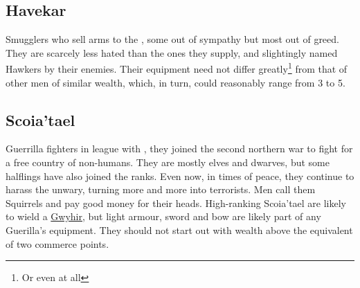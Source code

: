 \documentclass[parskip=full,11pt]{scrreport}
\begin{document}
\subsection{Havekar}
Smugglers who sell arms to the , some out of sympathy but most out of greed. They are scarcely less hated than the ones they supply,
and slightingly named Hawkers by their enemies. Their equipment need not differ greatly\footnote{Or even at all} from that of other men of similar
wealth, which, in turn, could reasonably range from 3 to 5.

\subsection{Scoia'tael}\label{profession:scoiatael}
Guerrilla fighters in league with , they joined the second northern war to fight for a free country of non-humans.
They are mostly elves and dwarves, but some halflings have also joined the ranks. Even now, in times of peace, they continue to harass the
unwary, turning more and more into terrorists. Men call them Squirrels and pay good money for their heads. High-ranking Scoia'tael are
likely to wield a \hyperref[weapon:gwyhir]{Gwyhir}, but light armour, sword and bow are likely part of any Guerilla's equipment.
They should not start out with wealth above the equivalent of two commerce points.
\end{document}

